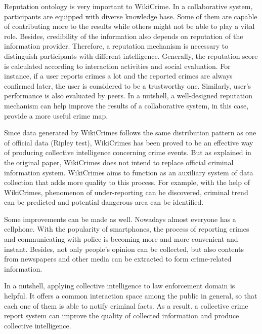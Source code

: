 Reputation ontology is very important to WikiCrime. In a collaborative system, participants are equipped with diverse knowledge base. Some of them are capable of contributing more to the results while others might not be able to play a vital role. Besides, credibility of the information also depends on reputation of the information provider. Therefore, a reputation mechanism is necessary to distinguish participants with different intelligence.  Generally, the reputation score is calculated according to interaction activities and social evaluation. For instance, if a user reports crimes a lot and the reported crimes are always confirmed later, the user is considered to be a trustworthy one. Similarly, user’s performance is also evaluated by peers. In a nutshell, a well-designed reputation mechanism can help improve the results of a collaborative system, in this case, provide a more useful crime map.

Since data generated by WikiCrimes follows the same distribution pattern as one of official data (Ripley test), WikiCrimes has been proved to be an effective way of producing collective intelligence concerning crime events. But as explained in the original paper, WikiCrimes does not intend to replace official criminal information system. WikiCrimes aims to function as an auxiliary system of data collection that adds more quality to this process. For example, with the help of WikiCrimes, phenomenon of under-reporting can be discovered, criminal trend can be predicted and potential dangerous area can be identified.

Some improvements can be made as well. Nowadays almost everyone has a cellphone. With the popularity of smartphones, the process of reporting crimes and communicating with police is becoming more and more convenient and instant. Besides, not only people’s opinion can be collected, but also contents from newspapers and other media can be extracted to form crime-related information.

In a nutshell, applying collective intelligence to law enforcement domain is helpful. It offers a common interaction space among the public in general, so that each one of them is able to notify criminal facts. As a result. a collective crime report system can improve the quality of collected information and produce collective intelligence. 
